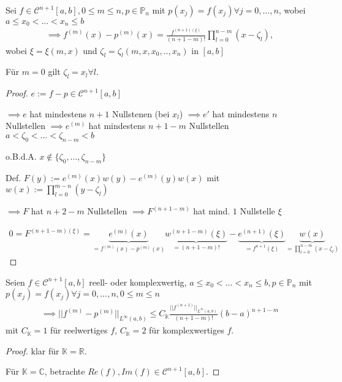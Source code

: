 \begin{theorem}[Interpolationsfehlerdarstellung]
	Sei $f \in \mathcal{C}^{n+1}[a,b], 0 \leq m \leq n, p \in \mathbb{P}_n$ mit $p(x_j) = f(x_j) \forall j=0, ..., n$, wobei $a \leq x_0 < ... < x_n \leq b$
	\begin{align*}
		\implies f^{(m)}(x) - p^{(m)}(x) = \frac{f^{(n+1)(\xi)}}{(n+1-m)!} \prod_{l=0}^{n-m}(x-\zeta_l),
	\end{align*}
	wobei $\xi = \xi(m,x)$ und $\zeta_l = \zeta_l(m,x,x_0,..,x_n)$ in $[a,b]$
	
	Für $m=0$ gilt $\zeta_l = x_l \forall l$.
\end{theorem}

\begin{proof}
	$e := f-p \in \mathcal{C}^{n+1}[a,b]$
	
	$\implies e$ hat mindestens $n+1$ Nullstenen (bei $x_l$) $\implies e'$ hat mindestens $n$ Nullstellen $\implies e^{(m)}$ hat mindestens $n+1-m$ Nullstellen $a < \zeta_0 < ... < \zeta_{n-m} < b$
	
	o.B.d.A. $x \notin \{\zeta_0, ..., \zeta_{n-m}\}$
	
	Def. $F(y) := e^{(m)}(x)w(y) - e^{(m)}(y) w(x)$ mit $w(x) := \prod_{l=0}^{m-n}(y-\zeta_l)$
	
	$\implies F$ hat $n+2-m$ Nullstellen $\implies F^{(n+1-m)}$ hat mind. $1$ Nullstelle $\xi$
	
	\begin{align*}
		0 = F^{(n+1-m)(\xi)} = \underbrace{e^{(m)}(x)}_{=f^{(m)}(x) - p^{(m)}(x)} \underbrace{w^{(n+1-m)}(\xi)}_{=(n+1-m)!} - \underbrace{e^{(n+1)}(\xi)}_{=f^{n+1}(\xi)} \underbrace{w(x)}_{=\prod_{l=0}^{n-m}(x-\zeta_l)}
	\end{align*}
\end{proof}

\begin{corollary}
	Seien $f \in \mathcal{C}^{n+1}[a,b]$ reell- oder komplexwertig, $a \leq x_0 < ... < x_n \leq b, p \in \mathbb{P}_n$ mit $p(x_j)=f(x_j) \forall j=0, ..., n, 0 \leq m \leq n$
	\begin{align*}
		\implies ||f^{(m)}-p^{(m)}||_{L^\infty(a,b)} \leq C_\mathbb{K} \frac{||f^{(n+1)}||_{L^\infty(a,b)}}{(n+1-m)!} (b-a)^{n+1-m}
	\end{align*}
	mit $C_{\mathbb{K}}=1$ für reelwertiges $f$, $C_{\mathbb{K}} = 2$ für komplexwertiges $f$.
\end{corollary}

\begin{proof}
	klar für $\mathbb{K} = \mathbb{R}$.
	
	Für $\mathbb{K} = \mathbb{C}$, betrachte $Re(f), Im(f) \in \mathcal{C}^{n+1}[a,b]$.
\end{proof}

